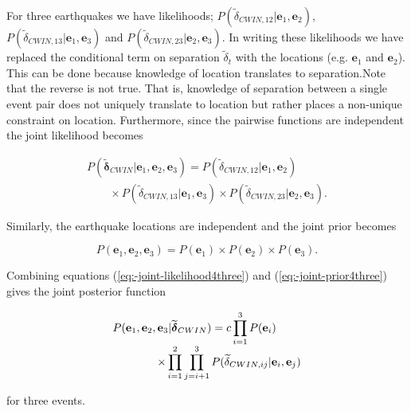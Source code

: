 \documentclass[12pt,double]{article}
\newcommand{\mitbf}[1]{  
  \hbox{\mathversion{bold}$#1$}}
\begin{document}
For three earthquakes we have likelihoods;
$P(\widetilde{\delta}_{CWIN,12}|\mathbf{e}_1, \mathbf{e}_2)$,
$P(\widetilde{\delta}_{CWIN,13}|\mathbf{e}_1, \mathbf{e}_3)$
and
$P(\widetilde{\delta}_{CWIN,23}|\mathbf{e}_2, \mathbf{e}_3)$.
In writing
these likelihoods we have replaced the conditional term on separation
$\widetilde{\delta}_t$ with the locations (e.g. $\mathbf{e}_1$ and $\mathbf{e}_2$).
This can be done because
knowledge of location translates to separation.Note that the reverse is
not true. That is, knowledge of separation between a single event pair
does not uniquely translate to location but rather places a non-unique constraint on
location.
Furthermore, since the pairwise functions are independent the joint
likelihood becomes
\begin{linenomath*} \begin{equation}
\begin{array}{l}
\label{eq:-joint-likelihood4three}
P(\widetilde{\mathbf{\delta}}_{CWIN} | \mathbf{e}_1, \mathbf{e}_2, \mathbf{e}_3) =
P(\widetilde{\delta}_{CWIN,12} | \mathbf{e}_1, \mathbf{e}_2) \\
\hspace{2em} \times P(\widetilde{\delta}_{CWIN,13} | \mathbf{e}_1, \mathbf{e}_3)
\times  P(\widetilde{\delta}_{CWIN,23} | \mathbf{e}_2, \mathbf{e}_3).
\end{array}
\end{equation} \end{linenomath*}
Similarly, the earthquake locations are independent and the
joint prior becomes
\begin{linenomath*} \begin{equation}
\label{eq:-joint-prior4three} P(\mathbf{e}_1, \mathbf{e}_2,
\mathbf{e}_3) = P(\mathbf{e}_1) \times P(\mathbf{e}_2) \times
P(\mathbf{e}_3).
\end{equation} \end{linenomath*}
Combining equations (\ref{eq:-joint-likelihood4three}) and
(\ref{eq:-joint-prior4three}) gives the joint posterior function
\begin{linenomath*} \begin{equation}
\label{eq-3eqposterior}
\begin{array}{l}
P(\mathbf{e}_1, \mathbf{e}_2, \mathbf{e}_3 | \widetilde{\mitbf{\delta}}_{CWIN}) = c \displaystyle \prod_{i=1}^3 P(\mathbf{e}_i) \\
\hspace{4em}  \times \displaystyle \prod_{i=1}^2 \prod_{j=i+1}^3
P(\widetilde{\delta}_{CWIN,ij}|\mathbf{e}_i,\mathbf{e}_j)
\end{array}
\end{equation} \end{linenomath*}
for three events.
\end{document}
